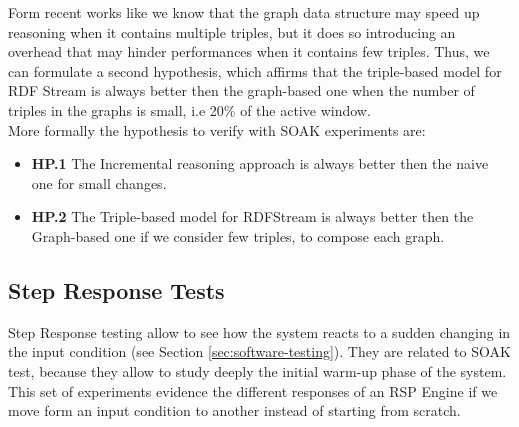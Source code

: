 Form recent works like \cite{DBLP:conf/semweb/BalduiniVDTPC13} we know that the graph data structure may speed up reasoning when it contains multiple triples, but it does so introducing an overhead that may hinder performances when it contains few triples. Thus, we can formulate a second hypothesis, which affirms that the triple-based model for RDF Stream is always better then the graph-based one when the number of triples in the graphs is small, i.e 20\% of the active window.\\

More formally the hypothesis to verify with SOAK experiments are:
\begin{itemize}
\item \textbf{HP.1} The Incremental reasoning approach is always better then the naive one for small changes.
\item \textbf{HP.2} The Triple-based model for RDFStream is always better then the Graph-based one if we consider few triples, to compose each graph.
\end{itemize}

 



\subsection{Step Response Tests}\label{sec:step-es}

Step Response testing allow to see how the system reacts to a sudden changing in the input condition (see Section \ref{sec:software-testing}). They are related to SOAK test, because they allow to study deeply the initial warm-up phase of the system. This set of experiments evidence the different responses of an RSP Engine if we move form an input condition to another instead of starting from scratch.

